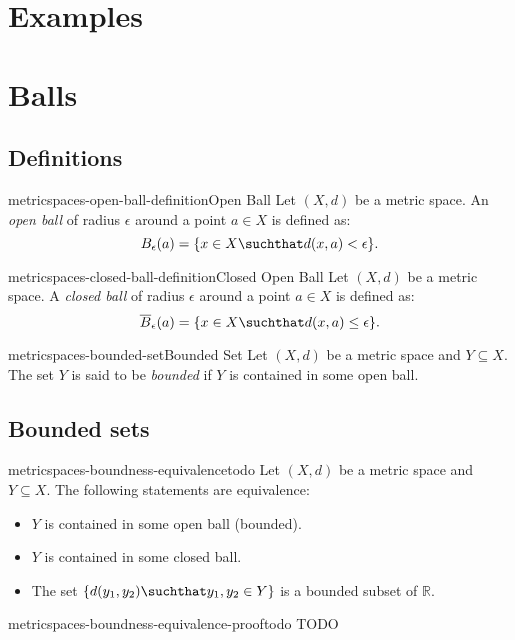 \documentclass[preview]{standalone}
\begin{document}
\section{Examples}


\section{Balls}

\subsection{Definitions}

\begin{snippetdefinition}{metricspaces-open-ball-definition}{Open Ball}
    Let \((X, d)\) be a metric space.
    An \textit{open ball} of radius \(\epsilon\) around a point
    \(a \in X\) is defined as:
    \[
        B_\epsilon(a) = \{x \in X \suchthat d(x,a) < \epsilon\}.
    \]
\end{snippetdefinition}

\begin{snippetdefinition}{metricspaces-closed-ball-definition}{Closed Open Ball}
    Let \((X, d)\) be a metric space.
    A \textit{closed ball} of radius \(\epsilon\) around a point
    \(a \in X\) is defined as:
    \[
        \overline{B}_\epsilon(a) = \{x \in X \suchthat d(x,a) \leq \epsilon\}.
    \]
\end{snippetdefinition}

\begin{snippetdefinition}{metricspaces-bounded-set}{Bounded Set}
    Let \((X, d)\) be a metric space and \(Y \subseteq X\).
    The set \(Y\) is said to be \textit{bounded} if \(Y\)
    is contained in some open ball.
\end{snippetdefinition}

\subsection{Bounded sets}

\begin{snippetlemma}{metricspaces-boundness-equivalence}{todo}
    Let \((X, d)\) be a metric space and \(Y \subseteq X\).
    The following statements are equivalence:
    \begin{itemize}
        \item \(Y\) is contained in some open ball (bounded).
        \item \(Y\) is contained in some closed ball.
        \item The set \(\{d(y_1,y_2) \suchthat y_1, y_2 \in Y\}\)
            is a bounded subset of \(\mathbb{R}\).
    \end{itemize}
\end{snippetlemma}

\begin{snippetproof}{metricspaces-boundness-equivalence-proof}{todo}
    TODO
\end{snippetproof}
\end{document}
